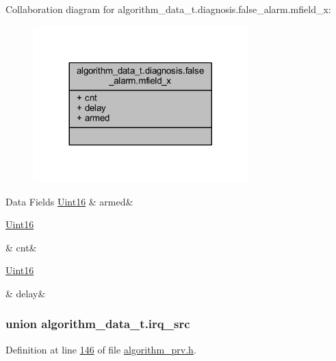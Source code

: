 Collaboration diagram for algorithm\+\_\+data\+\_\+t.\+diagnosis.\+false\+\_\+alarm.\+mfield\+\_\+x\+:\nopagebreak
\begin{figure}[H]
\begin{center}
\leavevmode
\includegraphics[width=236pt]{d0/dac/a00901}
\end{center}
\end{figure}
\begin{DoxyFields}{Data Fields}
\hypertarget{a00016_a6e0c631e86ef2402cfa1ca3608a5123e}{\hyperlink{a00072_a59a9f6be4562c327cbfb4f7e8e18f08b}{Uint16}}\label{a00016_a6e0c631e86ef2402cfa1ca3608a5123e}
&
armed&
\\
\hline

\hypertarget{a00016_a2817f701d5e1a1181e657251363295fd}{\hyperlink{a00072_a59a9f6be4562c327cbfb4f7e8e18f08b}{Uint16}}\label{a00016_a2817f701d5e1a1181e657251363295fd}
&
cnt&
\\
\hline

\hypertarget{a00016_a7243f8be75253afbadf7477867021f8b}{\hyperlink{a00072_a59a9f6be4562c327cbfb4f7e8e18f08b}{Uint16}}\label{a00016_a7243f8be75253afbadf7477867021f8b}
&
delay&
\\
\hline

\end{DoxyFields}
\label{d3/d32/a00105}
\hypertarget{a00016_d3/d32/a00105}{}
\subsubsection{union algorithm\+\_\+data\+\_\+t.\+irq\+\_\+src}


Definition at line \hyperlink{a00016_source_l00146}{146} of file \hyperlink{a00016_source}{algorithm\+\_\+prv.\+h}.



